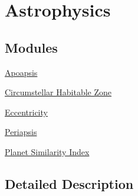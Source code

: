 \hypertarget{group___e_g_x_phys-_astrophysics}{}\section{Astrophysics}
\label{group___e_g_x_phys-_astrophysics}
\subsection*{Modules}
\begin{DoxyCompactItemize}
\item 
\hyperlink{group___e_g_x_phys-_apoapsis}{Apoapsis}
\item 
\hyperlink{group___e_g_x_phys-_circumstellar_habitable_zone}{Circumstellar Habitable Zone}
\item 
\hyperlink{group___e_g_x_phys-_eccentricity}{Eccentricity}
\item 
\hyperlink{group___e_g_x_phys-_periapsis}{Periapsis}
\item 
\hyperlink{group___e_g_x_phys-_planet_similarity_index}{Planet Similarity Index}
\end{DoxyCompactItemize}


\subsection{Detailed Description}
